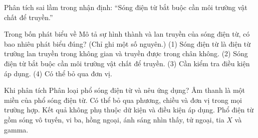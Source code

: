 \begin{bt}
Phân tích sai lầm trong nhận định: “Sóng điện từ bắt buộc cần môi trường vật chất để truyền.”
\end{bt}

\begin{ex}
Trong bốn phát biểu về Mô tả sự hình thành và lan truyền của sóng điện từ, có bao nhiêu phát biểu đúng? (Chỉ ghi một số nguyên.) (1) Sóng điện từ là điện từ trường lan truyền trong không gian và truyền được trong chân không. (2) Sóng điện từ bắt buộc cần môi trường vật chất để truyền. (3) Cần kiểm tra điều kiện áp dụng. (4) Có thể bỏ qua đơn vị.
\end{ex}

\begin{ex}
Khi phân tích Phân loại phổ sóng điện từ và nêu ứng dụng?
\choice
{Âm thanh là một miền của phổ sóng điện từ.}
{Có thể bỏ qua phương, chiều và đơn vị trong mọi trường hợp.}
{Kết quả không phụ thuộc dữ kiện và điều kiện áp dụng.}
{\True Phổ điện từ gồm sóng vô tuyến, vi ba, hồng ngoại, ánh sáng nhìn thấy, tử ngoại, tia $X$ và gamma.}
\end{ex}

